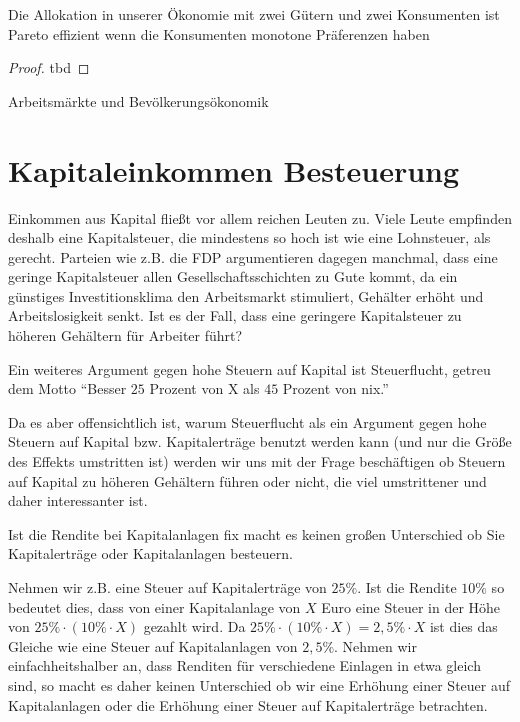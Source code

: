 \begin{theorem}[1. Wohlfahrtstheorem]
	Die Allokation in unserer Ökonomie mit zwei
	Gütern und zwei Konsumenten ist Pareto effizient wenn die Konsumenten
	monotone Präferenzen haben
\end{theorem}

\begin{proof}
	tbd
\end{proof}

\begin{remark}
	Arbeitsmärkte und Bevölkerungsökonomik
\end{remark}


\section{Kapitaleinkommen Besteuerung}
Einkommen aus Kapital fließt vor allem reichen Leuten zu. Viele Leute
empfinden deshalb eine Kapitalsteuer, die mindestens so hoch ist wie eine
Lohnsteuer, als gerecht. Parteien wie z.B. die FDP argumentieren dagegen
manchmal, dass eine geringe Kapitalsteuer allen Gesellschaftsschichten zu
Gute kommt, da ein günstiges Investitionsklima den Arbeitsmarkt
stimuliert, Gehälter erhöht und Arbeitslosigkeit senkt.
Ist es der Fall, dass eine geringere Kapitalsteuer zu höheren Gehältern für
Arbeiter führt?

\begin{remark}
	Ein weiteres Argument gegen hohe Steuern auf Kapital ist
	Steuerflucht, getreu dem Motto \enquote{Besser $25$ Prozent von X als $45$ Prozent
		von nix.}
\end{remark}


Da es aber offensichtlich ist, warum Steuerflucht als ein Argument gegen
hohe Steuern auf Kapital bzw. Kapitalerträge benutzt werden kann (und
nur die Größe des Effekts umstritten ist) werden wir uns mit der Frage
beschäftigen ob Steuern auf Kapital zu höheren Gehältern führen oder
nicht, die viel umstrittener und daher interessanter ist.


\begin{remark}
	Ist die Rendite bei Kapitalanlagen fix macht es keinen
	großen Unterschied ob Sie Kapitalerträge oder Kapitalanlagen besteuern.
\end{remark}
\begin{example}
	Nehmen wir z.B. eine Steuer auf Kapitalerträge von $25\%$. Ist die Rendite
	$10\%$ so bedeutet dies, dass von einer Kapitalanlage von $X$ Euro eine Steuer
	in der Höhe von $25\%\cdot (10\%\cdot X)$ gezahlt wird. Da $25\%\cdot (10\%\cdot X) = 2,5\%\cdot X$
	ist dies das Gleiche wie eine Steuer auf Kapitalanlagen von $2,5\%$.
	Nehmen wir einfachheitshalber an, dass Renditen für verschiedene Einlagen
	in etwa gleich sind, so macht es daher keinen Unterschied ob wir eine
	Erhöhung einer Steuer auf Kapitalanlagen oder die Erhöhung einer Steuer
	auf Kapitalerträge betrachten.
\end{example}
